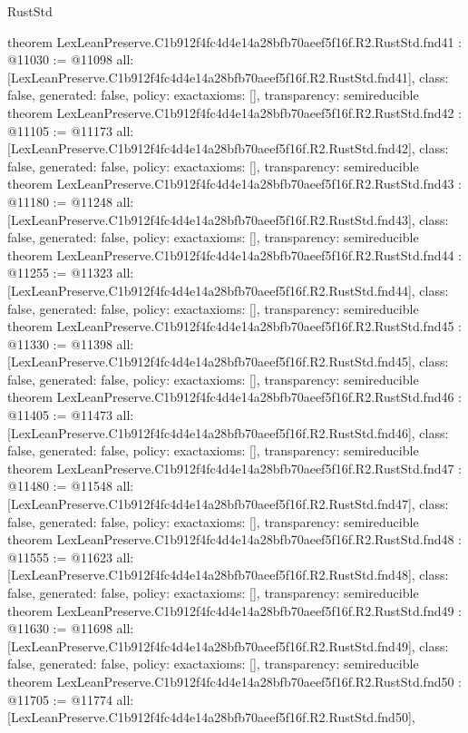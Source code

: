 \begin{lexlean}{RustStd}
\begin{coremodule}
{}
theorem LexLeanPreserve.C1b912f4fc4d4e14a28bfb70aeef5f16f.R2.RustStd.fnd41 : @11030 := @11098 {
  all: [LexLeanPreserve.C1b912f4fc4d4e14a28bfb70aeef5f16f.R2.RustStd.fnd41],
  class: false,
  generated: false,
  policy: exact{axioms: []},
  transparency: semireducible
}
theorem LexLeanPreserve.C1b912f4fc4d4e14a28bfb70aeef5f16f.R2.RustStd.fnd42 : @11105 := @11173 {
  all: [LexLeanPreserve.C1b912f4fc4d4e14a28bfb70aeef5f16f.R2.RustStd.fnd42],
  class: false,
  generated: false,
  policy: exact{axioms: []},
  transparency: semireducible
}
theorem LexLeanPreserve.C1b912f4fc4d4e14a28bfb70aeef5f16f.R2.RustStd.fnd43 : @11180 := @11248 {
  all: [LexLeanPreserve.C1b912f4fc4d4e14a28bfb70aeef5f16f.R2.RustStd.fnd43],
  class: false,
  generated: false,
  policy: exact{axioms: []},
  transparency: semireducible
}
theorem LexLeanPreserve.C1b912f4fc4d4e14a28bfb70aeef5f16f.R2.RustStd.fnd44 : @11255 := @11323 {
  all: [LexLeanPreserve.C1b912f4fc4d4e14a28bfb70aeef5f16f.R2.RustStd.fnd44],
  class: false,
  generated: false,
  policy: exact{axioms: []},
  transparency: semireducible
}
theorem LexLeanPreserve.C1b912f4fc4d4e14a28bfb70aeef5f16f.R2.RustStd.fnd45 : @11330 := @11398 {
  all: [LexLeanPreserve.C1b912f4fc4d4e14a28bfb70aeef5f16f.R2.RustStd.fnd45],
  class: false,
  generated: false,
  policy: exact{axioms: []},
  transparency: semireducible
}
theorem LexLeanPreserve.C1b912f4fc4d4e14a28bfb70aeef5f16f.R2.RustStd.fnd46 : @11405 := @11473 {
  all: [LexLeanPreserve.C1b912f4fc4d4e14a28bfb70aeef5f16f.R2.RustStd.fnd46],
  class: false,
  generated: false,
  policy: exact{axioms: []},
  transparency: semireducible
}
theorem LexLeanPreserve.C1b912f4fc4d4e14a28bfb70aeef5f16f.R2.RustStd.fnd47 : @11480 := @11548 {
  all: [LexLeanPreserve.C1b912f4fc4d4e14a28bfb70aeef5f16f.R2.RustStd.fnd47],
  class: false,
  generated: false,
  policy: exact{axioms: []},
  transparency: semireducible
}
theorem LexLeanPreserve.C1b912f4fc4d4e14a28bfb70aeef5f16f.R2.RustStd.fnd48 : @11555 := @11623 {
  all: [LexLeanPreserve.C1b912f4fc4d4e14a28bfb70aeef5f16f.R2.RustStd.fnd48],
  class: false,
  generated: false,
  policy: exact{axioms: []},
  transparency: semireducible
}
theorem LexLeanPreserve.C1b912f4fc4d4e14a28bfb70aeef5f16f.R2.RustStd.fnd49 : @11630 := @11698 {
  all: [LexLeanPreserve.C1b912f4fc4d4e14a28bfb70aeef5f16f.R2.RustStd.fnd49],
  class: false,
  generated: false,
  policy: exact{axioms: []},
  transparency: semireducible
}
theorem LexLeanPreserve.C1b912f4fc4d4e14a28bfb70aeef5f16f.R2.RustStd.fnd50 : @11705 := @11774 {
  all: [LexLeanPreserve.C1b912f4fc4d4e14a28bfb70aeef5f16f.R2.RustStd.fnd50],
}
\end{coremodule}
\end{lexlean}
